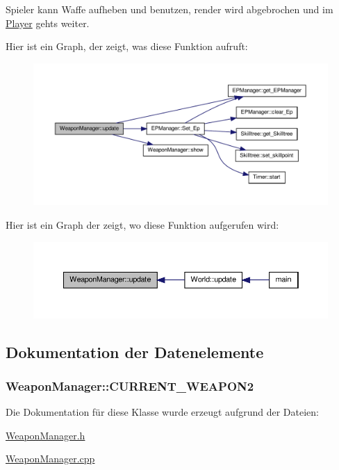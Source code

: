 Spieler kann Waffe aufheben und benutzen, render wird abgebrochen und im \hyperlink{class_player}{Player} gehts weiter. 



Hier ist ein Graph, der zeigt, was diese Funktion aufruft\-:
\nopagebreak
\begin{figure}[H]
\begin{center}
\leavevmode
\includegraphics[width=350pt]{class_weapon_manager_a59cc9e0d6cb21105cf00ac419ea2a573_cgraph}
\end{center}
\end{figure}




Hier ist ein Graph der zeigt, wo diese Funktion aufgerufen wird\-:
\nopagebreak
\begin{figure}[H]
\begin{center}
\leavevmode
\includegraphics[width=350pt]{class_weapon_manager_a59cc9e0d6cb21105cf00ac419ea2a573_icgraph}
\end{center}
\end{figure}




\subsection{Dokumentation der Datenelemente}
\hypertarget{class_weapon_manager_a25afeaede894545ee2f7d7f9f1ce760d}{
\subsubsection[{C\-U\-R\-R\-E\-N\-T\-\_\-\-W\-E\-A\-P\-O\-N2}]{ Weapon\-Manager\-::\-C\-U\-R\-R\-E\-N\-T\-\_\-\-W\-E\-A\-P\-O\-N2}}\label{class_weapon_manager_a25afeaede894545ee2f7d7f9f1ce760d}


Die Dokumentation für diese Klasse wurde erzeugt aufgrund der Dateien\-:\begin{DoxyCompactItemize}
\item 
\hyperlink{_weapon_manager_8h}{Weapon\-Manager.\-h}\item 
\hyperlink{_weapon_manager_8cpp}{Weapon\-Manager.\-cpp}\end{DoxyCompactItemize}
